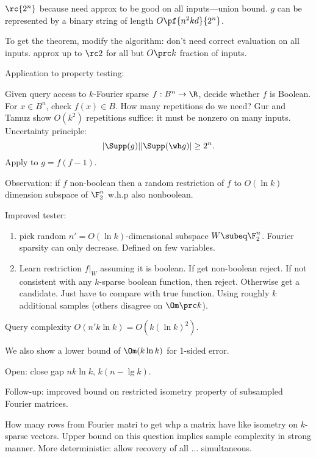 $\rc{2^n}$ because need approx to be good on all inputs---union bound.
$g$ can be represented by a binary string of length $O\pf{n^2kd}{2^n}$.

To get the theorem, modify the algorithm: don't need correct evaluation on all inputs. %
approx up to $\rc2$ for all but $O\prc k$ fraction of inputs.

Application to property testing:
\begin{prb}
Given query access to $k$-Fourier sparse $f:B^n\to \R$, decide whether $f$ is Boolean. For $x\in B^n$, check $f(x)\in B$. How many repetitions do we need?
Gur and Tamuz show $O(k^2)$ repetitions suffice: it must be nonzero on many inputs. Uncertainty principle:
\[
|\Supp(g)||\Supp(\wh g)|\ge 2^n.
\]
Apply to $g=f(f-1)$. 
\end{prb}
Observation: if $f$ non-boolean then a random restriction of $f$ to $O(\ln k)$ dimension subspace of $\F_2^n$ w.h.p also nonboolean.

Improved tester:
\begin{enumerate}
\item
pick random $n'=O(\ln k)$-dimensional subspace $W\subeq \F_2^n$. Fourier sparsity can only decrease. Defined on few variables.
\item
Learn restriction $f|_W$ assuming it is boolean.
If get non-boolean reject. If not consistent with any $k$-sparse boolean function, then reject. Otherwise get a candidate. Just have to compare with true function. Using roughly $k$ additional samples (others disagree on $\Om\prc k$).
\end{enumerate}
Query complexity $O(n'k\ln k)=O(k(\ln k)^2)$.

We also show a lower bound of $\Om(k\ln k)$ for 1-sided error.

Open: close gap $nk\ln k$, $k(n-\lg k)$. 

Follow-up: improved bound on restricted isometry property of subsampled Fourier matrices. 

How many rows from Fourier matri to get whp a matrix have like isometry on $k$-sparse vectors. Upper bound on this question implies sample complexity in strong manner. %
More deterministic: allow recovery of all ... simultaneous. 